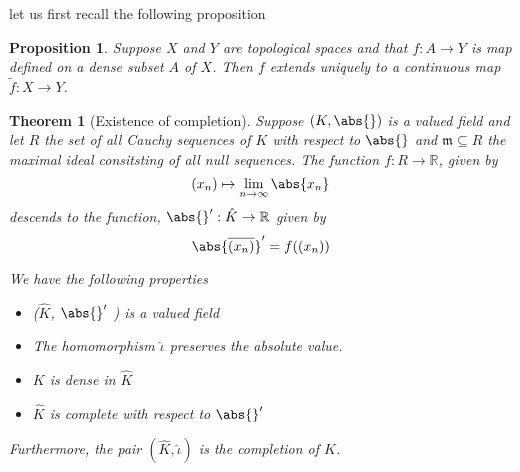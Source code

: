 \documentclass{article}
\newtheorem{theorem}{Theorem}[section]
\newtheorem{proposition}{Proposition}[section]
\newcommand{\mfrak}[1]{\mathfrak{#1}}
\newcommand{\mbb}[1]{\mathbb{#1}}
\begin{document}

let us first recall the following proposition
\begin{proposition}\label{prop: Function on a dense set}
    Suppose $X$ and $Y$ are topological spaces and that $f : A \to Y$ is map defined on a dense subset $A$ of $X$. Then $f$ extends uniquely to a continuous map $\tilde f : X \to Y$.
\end{proposition}

\begin{theorem}[Existence of completion]
    Suppose $(K, \abs{})$ is a valued field and let $R$ the set of all Cauchy sequences of $K$ with respect to $\abs{}$ and $\mfrak m \subseteq R$ the maximal ideal consitsting of all null sequences. The function $f : R \to \mbb R$, given by
    $$(x_n) \mapsto \lim_{n \to \infty} \abs{x_n}$$
    descends to the function, $\abs{}' : \hat K \to \mbb R$ given by 
    $$\abs{\overline {(x_n)}}' = f( (x_n) )$$
    
    We have the following properties
    \begin{itemize}
        \item ($\hat K$, $\abs{}'$ ) is a valued field
        \item The homomorphism $\hat \iota$ preserves the absolute value.
        \item $K$ is dense in $\hat K$
        \item $\hat K$ is complete with respect to $\abs{}'$
    \end{itemize}

    Furthermore, the pair $(\hat K, \hat \iota)$ is the completion of $K$.

\end{theorem}
\end{document}
